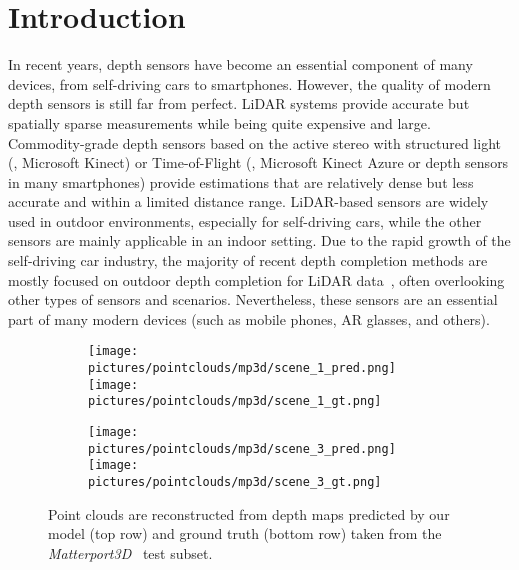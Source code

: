 \documentclass[final]{cvpr}
\begin{document}
\section{Introduction}

    In recent years, depth sensors have become an essential component of many devices, from self-driving cars to smartphones. However, the quality of modern depth sensors is still far from perfect. LiDAR systems provide accurate but spatially sparse measurements while being quite expensive and large. Commodity-grade depth sensors based on the active stereo with structured light (\eg, Microsoft Kinect) or Time-of-Flight (\eg, Microsoft Kinect Azure or depth sensors in many smartphones) provide estimations that are relatively dense but less accurate and within a limited distance range. LiDAR-based sensors are widely used in outdoor environments, especially for self-driving cars, while the other sensors are mainly applicable in an indoor setting. Due to the rapid growth of the self-driving car industry, the majority of recent depth completion methods are mostly focused on outdoor depth completion for LiDAR data~\cite{uhrig, guidenet, cspn}, often overlooking other types of sensors and scenarios. Nevertheless, these sensors are an essential part of many modern devices (such as mobile phones, AR glasses, and others). 

    \begin{figure}[t]
      \centering
      \begin{subfigure}[b]{0.49\linewidth}
        \centering
        \texttt{[image: pictures/pointclouds/mp3d/scene\_1\_pred.png]}
        \centering
        \texttt{[image: pictures/pointclouds/mp3d/scene\_1\_gt.png]}
      \end{subfigure}
      \begin{subfigure}[b]{0.49\linewidth}
        \centering
        \texttt{[image: pictures/pointclouds/mp3d/scene\_3\_pred.png]}
        \centering
        \texttt{[image: pictures/pointclouds/mp3d/scene\_3\_gt.png]}
      \end{subfigure}
      \caption{Point clouds are reconstructed from depth maps predicted by our model (top row) and ground truth (bottom row) taken from the \emph{Matterport3D}~\cite{Matterport3D} test subset. }
      \label{fig:mp3d_point_clouds}
    \end{figure}
    
\end{document}
